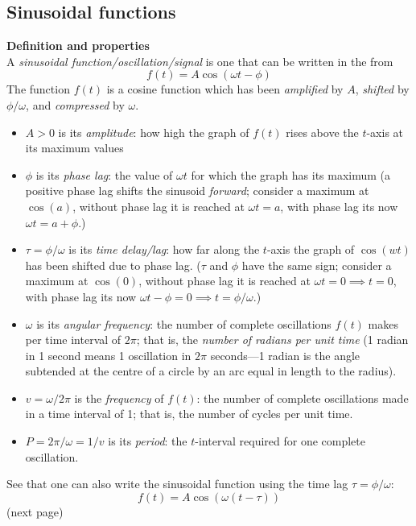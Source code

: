 \documentclass{report}
\begin{document}
\subsection{Sinusoidal functions}
\textbf{Definition and properties}\\
A \textit{sinusoidal function/oscillation/signal} is one
that can be written in the from
\begin{equation*}
f(t)=A\cos(\omega t-\phi)
\end{equation*}
The function $f(t)$ is a cosine function which has been 
\textit{amplified} by $A$, \textit{shifted} by $\phi/\omega$, and \textit{compressed} by $\omega$.
\begin{itemize}
\item$A>0$ is its \textit{amplitude}: how high the graph of $f(t)$ rises above the $t$-axis at its maximum values
\item$\phi$ is its \textit{phase lag}: the value of $\omega t$ for which the graph has its maximum 
(a positive phase lag shifts the sinusoid \textit{forward}; consider a maximum at $\cos(a)$, 
without phase lag it is reached at $\omega t=a$, with phase lag its now $\omega t=a+\phi$.)
\item$\tau=\phi/\omega$ is its \textit{time delay/lag}: how far along the $t$-axis the graph of $\cos(wt)$ has been 
shifted due to phase lag. ($\tau$ and $\phi$ have the same sign; consider a maximum at $\cos(0)$, without
phase lag it is reached at $\omega t=0\implies t=0$, with phase lag its now 
$\omega t-\phi=0\implies t=\phi/\omega$.)
\item$\omega$ is its \textit{angular frequency}: the number of complete oscillations $f(t)$ makes per time interval
of $2\pi$; that is, the \textit{number of radians per unit time} 
(1 radian in 1 second means 1 oscillation in $2\pi$ seconds---1 radian is the angle subtended at the centre of 
a circle by an arc equal in length to the radius).
\item$v=\omega/2\pi$ is the \textit{frequency} of $f(t)$: the number of complete oscillations made in a
time interval of 1; that is, the number of cycles per unit time.
\item$P=2\pi/\omega=1/v$ is its \textit{period}: the $t$-interval required for one complete oscillation.
\end{itemize}
See that one can also write the sinusoidal function using
the time lag $\tau=\phi/\omega$:
\begin{equation*}
f(t)=A\cos(\omega(t-\tau))
\end{equation*}
(next page)
\end{document}
